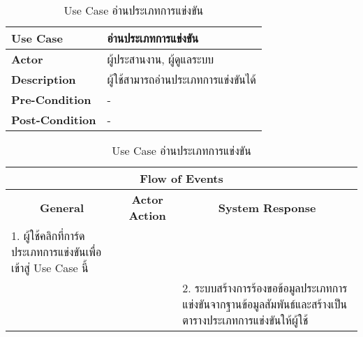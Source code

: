 \begin{table}[H]
    \caption{Use Case อ่านประเภทการแข่งขัน}
    \label{tab:usecase-read-contest}
    \begin{tabularx}{\textwidth}{ | p{3cm} | X | }
    \hline
    \textbf{Use Case} & อ่านประเภทการแข่งขัน \\
    \hline
    \textbf{Actor} & ผู้ประสานงาน, ผู้ดูแลระบบ \\
    \hline
    \textbf{Description} & ผู้ใช้สามารถอ่านประเภทการแข่งขันได้ \\
    \hline
    \textbf{Pre-Condition} & - \\
    \hline
    \textbf{Post-Condition} & - \\
    \hline
    \end{tabularx}
    \begin{tabularx}{\textwidth}{ | X | X | X | }
    \multicolumn{3}{|c|}{\textbf{Flow of Events}} \\
    \hline
    \multicolumn{1}{|c|}{\textbf{General}} & \multicolumn{1}{|c|}{\textbf{Actor Action}} & \multicolumn{1}{|c|}{\textbf{System Response}} \\
    \hline
    1. ผู้ใช้คลิกที่การ์ดประเภทการแข่งขันเพื่อเข้าสู่ Use Case นี้ &  &  \\
    \hline
    & & 2. ระบบสร้างการร้องขอข้อมูลประเภทการแข่งขันจากฐานข้อมูลสัมพันธ์และสร้างเป็นตารางประเภทการแข่งขันให้ผู้ใช้ \\
    \hline
    \end{tabularx}
\end{table}
